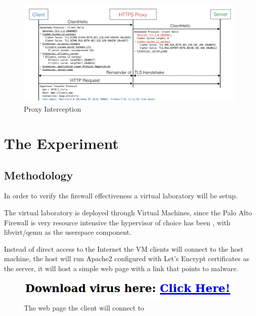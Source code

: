 \begin{figure}[h!]
 \centering
 \includegraphics[width=13cm]{img/https_proxy_interception.png}
 \caption{ Proxy Interception\protect\cite{https-interception}}
 \label{fig: HTTPS Proxy Interception}
\end{figure}


\chapter{The Experiment}
\section{Methodology}

In order to verify the firewall effectiveness a virtual laboratory will be setup.

The virtual laboratory is deployed through Virtual Machines, since the Palo Alto Firewall is very resource intensive the hypervisor of choice has been \cite{kvm}, with libvirt/qemu\cite{libvirt}\cite{qemu} as the userspace component.

Instead of direct access to the Internet the VM clients will connect to the host machine, the host will run Apache2\cite{apache2} configured with Let's Encrypt\cite{letsencrypt} certificates as the  server, it will host a simple web page with a link that points to malware.

\begin{figure}[h!]
 \centering
 \includegraphics[width=13cm]{img/webpage.png}
 \caption{The web page the client will connect to}
 \label{fig: webpage}
\end{figure}

